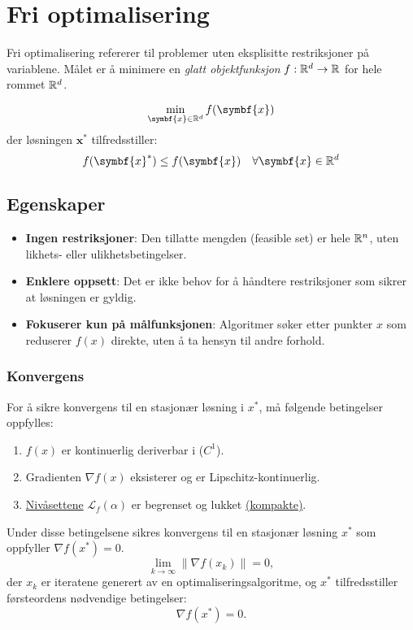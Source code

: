 \chapter{Fri optimalisering}

Fri optimalisering refererer til problemer uten eksplisitte restriksjoner på variablene.
Målet er å minimere en \textit{glatt objektfunksjon} \( f : \mathbb{R}^d \to \mathbb{R} \) for hele rommet \( \mathbb{R}^d \).

\[
  \min_{\symbf{x} \in \R^d} f(\symbf{x})
\]
der løsningen \( \symbf{x}^* \) tilfredsstiller:
\[
  f(\symbf{x}^*) \leq f(\symbf{x}) \quad \forall \symbf{x} \in \R^d
\]

\section{Egenskaper}

\begin{itemize}
  \item \textbf{Ingen restriksjoner}: Den tillatte mengden (feasible set) er hele \( \mathbb{R}^n \), uten likhets- eller ulikhetsbetingelser.
  \item \textbf{Enklere oppsett}: Det er ikke behov for å håndtere restriksjoner som sikrer at løsningen er gyldig.
  \item \textbf{Fokuserer kun på målfunksjonen}: Algoritmer søker etter punkter \( x \) som reduserer \( f(x) \) direkte, uten å ta hensyn til andre forhold.
\end{itemize}

\subsection{Konvergens}
For å sikre konvergens til en stasjonær løsning i \( x^* \), må følgende betingelser oppfylles:
\begin{enumerate}
  \item \(f(x)\) er kontinuerlig deriverbar i (\(C^1\)).
  \item Gradienten \(\nabla f(x)\) eksisterer og er Lipschitz-kontinuerlig.
  \item \hyperref[def:level_set]{Nivåsettene} \(\mathcal{L}_f(\alpha)\) er begrenset og lukket \hyperref[def:compact_set]{(kompakte)}.
\end{enumerate}
Under disse betingelsene sikres konvergens til en stasjonær løsning \( x^* \) som oppfyller \(\nabla f(x^*) = 0\).
\[
  \lim_{k \to \infty} \|\nabla f(x_k)\| = 0,
\]
der \( x_k \) er iteratene generert av en optimaliseringsalgoritme, og \( x^* \) tilfredsstiller førsteordens nødvendige betingelser:
\[
  \nabla f(x^*) = 0.
\]

